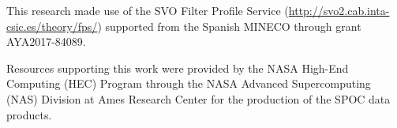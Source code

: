 \documentclass[12pt,twocolumn,tighten]{aastex63}
\begin{document}
This research made use of the SVO Filter Profile Service
(\url{http://svo2.cab.inta-csic.es/theory/fps/}) supported from the Spanish
MINECO through grant AYA2017-84089.

Resources supporting this work were provided by the NASA High-End
Computing (HEC) Program through the NASA Advanced Supercomputing (NAS)
Division at Ames Research Center for the production of the SPOC data
products.
%

%
%
%
\end{document}
